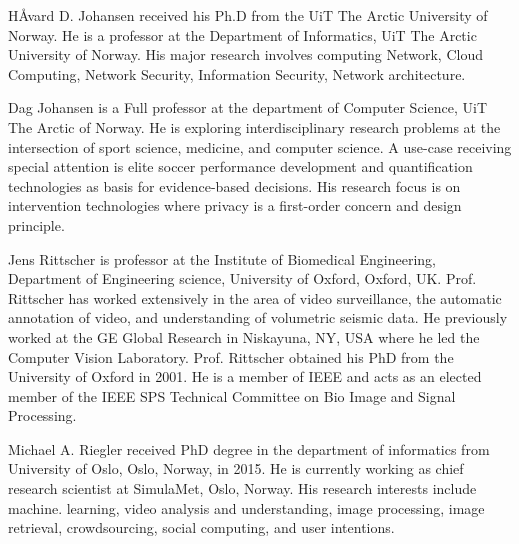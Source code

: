 \documentclass[journal]{IEEEtran}
\begin{document}
\begin{IEEEbiography}{H{\AA}vard D. Johansen} received his Ph.D from the UiT  The Arctic University of Norway. He is a professor at the Department of Informatics, UiT The Arctic University of Norway. His major research involves computing Network, Cloud Computing, Network Security, Information Security, Network architecture. 
\end{IEEEbiography}

\begin{IEEEbiography}{Dag Johansen} is a Full professor at the department of Computer Science, UiT The Arctic of Norway. He is exploring interdisciplinary research problems at the intersection of sport science, medicine, and computer science. A use-case receiving special attention is elite soccer performance development and quantification technologies as basis for evidence-based decisions. His research focus is on intervention technologies where privacy is a first-order concern and design principle.
\end{IEEEbiography}

\begin{IEEEbiography} {Jens Rittscher} is professor at the Institute of Biomedical Engineering, Department of Engineering science, University of Oxford, Oxford, UK. Prof. Rittscher has worked extensively in the area of video surveillance, the automatic annotation of video, and understanding of volumetric seismic data. He previously worked at the GE Global Research in Niskayuna, NY, USA where he led the Computer Vision Laboratory. Prof. Rittscher obtained his PhD from the University of Oxford in 2001. He is a member of IEEE and acts as an elected member of the IEEE SPS Technical Committee on Bio Image and Signal Processing.
\end{IEEEbiography}

\begin{IEEEbiography}{Michael A. Riegler} received PhD degree in the department of informatics from University of Oslo, Oslo, Norway, in 2015. He is currently working as chief research scientist at SimulaMet, Oslo, Norway. His research interests include machine. learning, video analysis and understanding, image processing, image retrieval, crowdsourcing, social computing, and user intentions.
\end{IEEEbiography}
\end{document}
